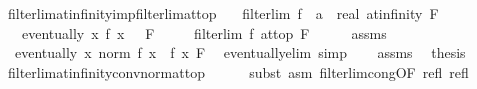 \begin{isabellebody}
\isamarkupfalse%
%
\endisatagproof
{\isafoldproof}%
%
\isadelimproof
\isanewline
%
\endisadelimproof
\isanewline
{}\isamarkupfalse%
\ filterlim{\isacharunderscore}{\kern0pt}at{\isacharunderscore}{\kern0pt}infinity{\isacharunderscore}{\kern0pt}imp{\isacharunderscore}{\kern0pt}filterlim{\isacharunderscore}{\kern0pt}at{\isacharunderscore}{\kern0pt}top{\isacharcolon}{\kern0pt}\isanewline
\ \ \ {\isachardoublequoteopen}filterlim\ {\isacharparenleft}{\kern0pt}f\ {\isacharcolon}{\kern0pt}{\isacharcolon}{\kern0pt}\ {\isacharprime}{\kern0pt}a\ {\isasymRightarrow}\ real{\isacharparenright}{\kern0pt}\ at{\isacharunderscore}{\kern0pt}infinity\ F{\isachardoublequoteclose}\isanewline
\ \ \ {\isachardoublequoteopen}eventually\ {\isacharparenleft}{\kern0pt}{\isasymlambda}x{\isachardot}{\kern0pt}\ f\ x\ {\isachargreater}{\kern0pt}\ {}{\isacharparenright}{\kern0pt}\ F{\isachardoublequoteclose}\isanewline
\ \ \ \ \ {\isachardoublequoteopen}filterlim\ f\ at{\isacharunderscore}{\kern0pt}top\ F{\isachardoublequoteclose}\isanewline
%
\isadelimproof
%
\endisadelimproof
%
\isatagproof
{}\isamarkupfalse%
\ {\isacharminus}{\kern0pt}\isanewline
\ \ \isamarkupfalse%
\ assms{\isacharparenleft}{\kern0pt}{}{\isacharparenright}{\kern0pt}\ \isamarkupfalse%
\ {\isacharasterisk}{\kern0pt}{\isacharcolon}{\kern0pt}\ {\isachardoublequoteopen}eventually\ {\isacharparenleft}{\kern0pt}{\isasymlambda}x{\isachardot}{\kern0pt}\ norm\ {\isacharparenleft}{\kern0pt}f\ x{\isacharparenright}{\kern0pt}\ {\isacharequal}{\kern0pt}\ f\ x{\isacharparenright}{\kern0pt}\ F{\isachardoublequoteclose}\ \isamarkupfalse%
\ eventually{\isacharunderscore}{\kern0pt}elim\ simp\isanewline
\ \ \isamarkupfalse%
\ assms{\isacharparenleft}{\kern0pt}{}{\isacharparenright}{\kern0pt}\ \isamarkupfalse%
\ {\isacharquery}{\kern0pt}thesis\ \isamarkupfalse%
\ filterlim{\isacharunderscore}{\kern0pt}at{\isacharunderscore}{\kern0pt}infinity{\isacharunderscore}{\kern0pt}conv{\isacharunderscore}{\kern0pt}norm{\isacharunderscore}{\kern0pt}at{\isacharunderscore}{\kern0pt}top\isanewline
\ \ \ \ \isamarkupfalse%
\ {\isacharparenleft}{\kern0pt}subst\ {\isacharparenleft}{\kern0pt}asm{\isacharparenright}{\kern0pt}\ filterlim{\isacharunderscore}{\kern0pt}cong{\isacharbrackleft}{\kern0pt}OF\ refl\ refl\ {\isacharasterisk}{\kern0pt}{\isacharbrackright}{\kern0pt}{\isacharparenright}{\kern0pt}\isanewline

\end{isabellebody}
